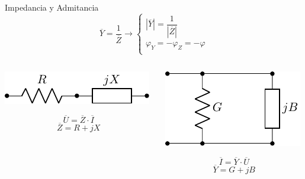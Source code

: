 \documentclass[aspectratio=169, usenames,svgnames,dvipsnames]{beamer}
\begin{document}
\begin{frame}[label={sec:orgb99611e}]{Impedancia y Admitancia}
\[
\boxed{
  \overline{Y} = \dfrac{1}{\overline{Z}} \rightarrow \left\{%
    \begin{array}{l}
    |\overline{Y}| = \dfrac{1}{|\overline{Z}|}\\[12pt]
    \varphi_Y = -\varphi_Z = - \varphi\\
    \end{array}\right.
      }
\]

\begin{columns}
\begin{column}{0.5\columnwidth}
\begin{center}
\includegraphics[height=0.1\textheight]{../figs/Z.pdf}
\end{center}
\[
  \overline{U} = \overline{Z} \cdot \overline{I}
\]
\[
  \overline{Z} = R + j X
\]
\end{column}

\begin{column}{0.5\columnwidth}
\begin{center}
\includegraphics[height=0.25\textheight]{../figs/Y.pdf}
\end{center}
\[
  \overline{I} = \overline{Y} \cdot \overline{U}
\]
\[
  \overline{Y} = G + j B
\]
\end{column}
\end{columns}
\end{frame}
\end{document}
